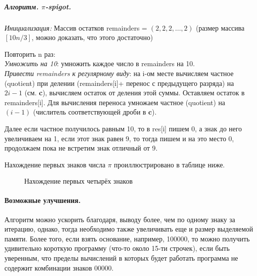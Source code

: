 \documentclass{book}
\begin{document}
\subparagraph*{Алгоритм. $\pi$-spigot.\\}
\begin{normalsize}
	\begin{list}{•}{}
		\item \textit{Инициализация:} Массив остатков remainders = $(2,2,2,...,2)$ (размер массива $[10n/3]$, можно доказать, что этого достаточно)\\
		\item Повторить n раз:\\
		\textit{Умножить на 10}: умножить каждое число в remainders на 10.\\
		\textit{Привести remainders к регулярному виду}: на i-ом месте вычисляем частное (quotient) при делении (remainders[i]+ перенос с предыдущего разряда) на $2i-1$ (см. \textbf{c}), вычисляем остаток от деления этой суммы. Оставляем остаток в remainders[i]. Для вычисления переноса умножаем частное (quotient) на $(i-1)$ (числитель соответствующей дроби в $\textbf{c}$).\\
		\item Далее если частное получилось равным 10, то в res[i] пишем 0, а знак до него увеличиваем на 1, если этот знак равен 9, то тогда пишем и на это место 0, продолжаем пока не встретим знак отличный от 9.
	\end{list}
\end{normalsize}
Нахождение первых знаков числа $\pi$ проиллюстрировано в таблице ниже.\\
\begin{figure}[h!]
\caption{Нахождение первых четырёх знаков}
\label{ris:2}
\end{figure}
\paragraph{Возможные улучшения.\\}
Алгоритм можно ускорить благодаря, выводу более, чем по одному знаку за итерацию, однако, тогда необходимо также увеличивать еще и размер выделяемой памяти. Более того, если взять основание, например, 100000, то можно получить удивительно короткую программу (что-то около 15-ти строчек), если быть уверенным, что пределы вычислений в которых будет работать программа не содержит комбинации знаков 00000.
\end{document}
